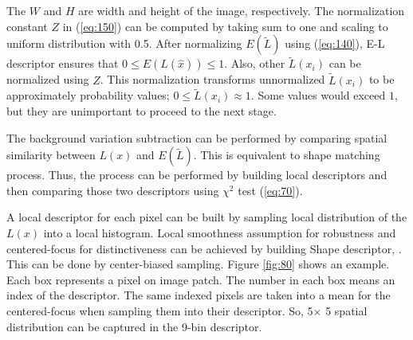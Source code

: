 \documentclass[conference]{IEEEtran}
\begin{document}
The \begin{math} W \end{math} and \begin{math} H \end{math} are width and height of the image, respectively. The normalization constant \begin{math} Z \end{math} in (\ref{eq:150}) can be computed by taking sum to one and scaling to uniform distribution with 0.5. After normalizing \begin{math} E(\tilde{L}) \end{math} using (\ref{eq:140}), E-L descriptor ensures that \begin{math} 0 \le E( L(\hat{x})) \le 1 \end{math}. Also, other \begin{math} \tilde{L}( x_i ) \end{math}  can be normalized using \begin{math} Z \end{math}. This normalization transforms unnormalized \begin{math} \tilde{L}( x_i ) \end{math} to be approximately probability values; \begin{math} 0 \le \tilde{L}( x_i ) \approx 1 \end{math}. Some values would exceed \begin{math} 1 \end{math}, but they are unimportant to proceed to the next stage.

The background variation subtraction can be performed by comparing spatial similarity between \begin{math} L(x) \end{math}  and \begin{math} E(\tilde{L}) \end{math}. This is equivalent to shape matching process. Thus, the process can be performed by building local descriptors and then comparing those two descriptors using \begin{math} \chi ^2 \end{math} test (\ref{eq:70}).

A local descriptor for each pixel can be built by sampling local distribution of the \begin{math} L(x) \end{math} into a local histogram. Local smoothness assumption for robustness and centered-focus for distinctiveness can be achieved by building Shape descriptor, \cite{Mikolajczyk, Belongie}. This can be done by center-biased sampling. Figure \ref{fig:80} shows an example. Each box represents a pixel on image patch. The number in each box means an index of the descriptor. The same indexed pixels are taken into a mean for the centered-focus when sampling them into their descriptor. So, 5\begin{math} \times \end{math} 5 spatial distribution can be captured in the 9-bin descriptor. 
\end{document}
